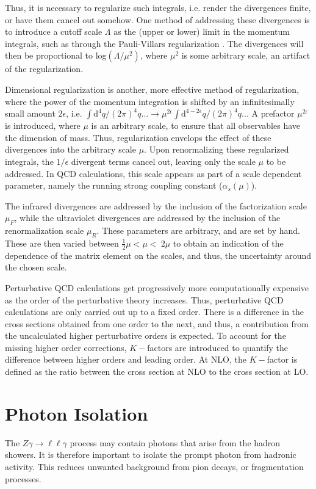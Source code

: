 \documentclass[12pt,a4paper,openright,twoside]{report}
\newcommand{\Zg}{$Z\gamma\to \ell\ell\gamma$ }
\begin{document}
Thus, it is necessary to regularize such integrals, i.e. render the divergences finite, or have them cancel out somehow. One method of addressing these divergences is to introduce a cutoff scale $\Lambda$ as the (upper or lower) limit in the momentum integrals, such as through the Pauli-Villars regularization \cite{Pauli-Villars}. The divergences will then be proportional to log$(\Lambda/\mu^2)$, where $\mu^2$ is some arbitrary scale, an artifact of the regularization.

Dimensional regularization is another, more effective method of regularization, where the power of the momentum integration is shifted by an infinitesimally small amount $2\epsilon$, i.e. $\int \mathrm{d}^4q/(2\pi)^4 q... \to \mu^{2\epsilon}\int \mathrm{d}^{4-2\epsilon}q/(2\pi)^4 q...$ A prefactor $\mu^{2\epsilon}$ is introduced, where $\mu$ is an arbitrary scale, to ensure that all observables have the dimension of mass. Thus, regularization envelops the effect of these divergences into the arbitrary scale $\mu$. Upon renormalizing these regularized integrals, the $1/\epsilon$ divergent terms cancel out, leaving only the scale $\mu$ to be addressed. In QCD calculations, this scale appears as part of a scale dependent parameter, namely the running strong coupling constant ($\alpha_s(\mu)$).

The infrared divergences are addressed by the inclusion of the factorization scale $\mu_F$, while the ultraviolet divergences are addressed by the inclusion of the renormalization scale $\mu_R$. These parameters are arbitrary, and are set by hand. These are then varied between $\frac{1}{2}\mu < \mu < \ 2\mu$ to obtain an indication of the dependence of the matrix element on the scales, and thus, the uncertainty around the chosen scale. 

Perturbative QCD calculations get progressively more computationally expensive as the order of the perturbative theory increases. Thus, perturbative QCD calculations are only carried out up to a fixed order. There is a difference in the cross sections obtained from one order to the next, and thus, a contribution from the uncalculated higher perturbative orders is expected. To account for the missing higher order corrections, $K-$factors are introduced to quantify the difference between higher orders and leading order. At NLO, the $K-$factor is defined as the ratio between the cross section at NLO to the cross section at LO.

\section{Photon Isolation}\label{sec:Isolation}
The \Zg process may contain photons that arise from the hadron showers. It is therefore important to isolate the prompt photon from hadronic activity. This reduces unwanted background from pion decays, or fragmentation processes.
\end{document}
